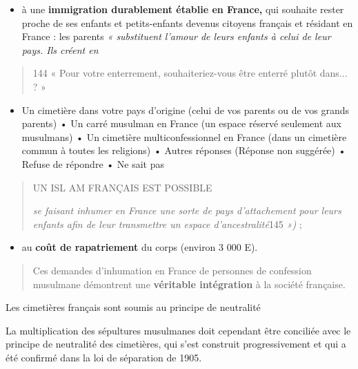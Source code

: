 \begin{itemize}
\item
  à une \textbf{immigration durablement établie en France,} qui souhaite
  rester proche de ses enfants et petits-enfants devenus citoyens
  français et résidant en France : les parents \emph{« substituent
  l'amour de leurs enfants à celui de leur pays. Ils créent en}
\end{itemize}

\begin{quote}
144 « Pour votre enterrement, souhaiteriez-vous être enterré plutôt
dans... ? »
\end{quote}

\begin{itemize}
\item
  Un cimetière dans votre pays d'origine (celui de vos parents ou de vos
  grands parents) • Un carré musulman en France (un espace réservé
  seulement aux musulmans) • Un cimetière multiconfessionnel en France
  (dans un cimetière commun à toutes les religions) • Autres réponses
  (Réponse non suggérée) • Refuse de répondre • Ne sait pas
\end{itemize}

\begin{quote}
UN ISL AM FRANÇAIS EST POSSIBLE

\emph{se faisant inhumer en France une sorte de pays d'attachement pour
leurs enfants afin de leur transmettre un espace d'ancestralité}145
\emph{»)} ;
\end{quote}

\begin{itemize}
\item
  au \textbf{coût de rapatriement} du corps (environ 3 000 E).
\end{itemize}

\begin{quote}
Ces demandes d'inhumation en France de personnes de confession musulmane
démontrent une \textbf{véritable intégration} à la société française.
\end{quote}

Les cimetières français sont soumis au principe de neutralité

La multiplication des sépultures musulmanes doit cependant être
conciliée avec le principe de neutralité des cimetières, qui s'est
construit progressivement et qui a été confirmé dans la loi de
séparation de 1905.

